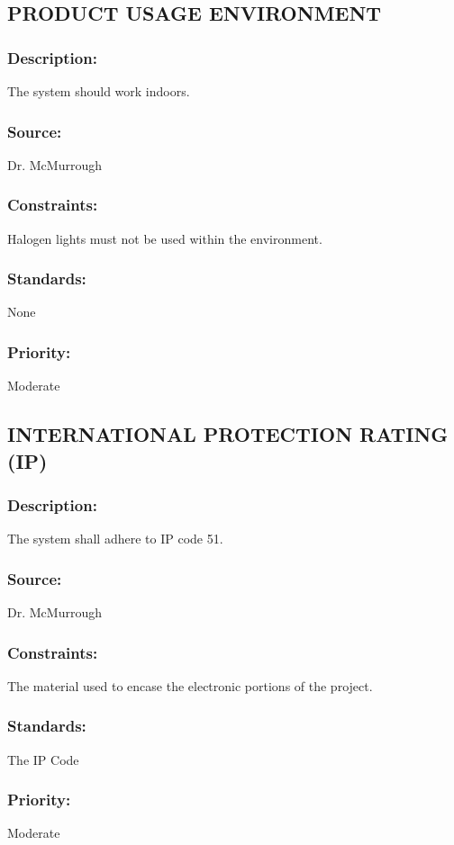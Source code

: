 \subsection{\text PRODUCT USAGE ENVIRONMENT}
\subsubsection{Description:} 
	{The system should work indoors.}
\subsubsection{Source:} 
	{Dr. McMurrough}
\subsubsection{Constraints:} 
	{Halogen lights must not be used within the environment.}
\subsubsection{Standards:} 
	{None}
\subsubsection{Priority:} 
	{Moderate}
\newline
\newline
	
\subsection{\text INTERNATIONAL PROTECTION RATING (IP)}
\subsubsection{Description:} 
	{The system shall adhere to IP code 51.}
\subsubsection{Source:} 
	{Dr. McMurrough}
\subsubsection{Constraints:} 
	{The material used to encase the electronic portions of the project.}
\subsubsection{Standards:} 
	{The IP Code}
\subsubsection{Priority:} 
	{Moderate}
\newline
\newline
	
